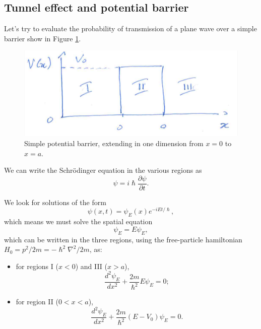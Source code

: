 \subsection{Tunnel effect and potential barrier}
Let's try to evaluate the probability of transmission of a plane wave over a simple barrier show in Figure \ref{nuclear-physics-fig:6}.
\begin{figure}[h]
    \centering
    \includegraphics[scale=0.35]{Figures/nuclear-physics-fig6}
    \caption{Simple potential barrier, extending in one dimension from \(x=0\) to \(x=a\).}
    \label{nuclear-physics-fig:6}
\end{figure}
We can write the Schr\"odinger equation in the various regions as
\begin{equation*}
    [H_0 + V(x)]\psi = i\hslash\frac{\partial \psi}{\partial t}.
\end{equation*}

We look for solutions of the form
\begin{equation*}
    \psi (x,t) = \psi_{E}(x)e^{-iEt/\hslash}, %
\end{equation*}
which means we must solve the spatial equation
\begin{equation*}
    [H_0 + V(x)]\psi_E = E\psi_E,
\end{equation*}
which can be written in the three regions, using the free-particle hamiltonian $H_0=p^2/2m=-\hslash^2\nabla^2/2m$, as:
\begin{itemize}
    \item for regions I ($x<0$) and III ($x>a$), \begin{equation}
        \frac{d^2\psi_E}{dx^2} + \frac{2m}{\hslash^2}E\psi_E = 0;
    \end{equation}
    \item for region II ($0<x<a$),
    \begin{equation*}
        \frac{d^2\psi_E}{dx^2}+\frac{2m}{\hslash^2}(E-V_0)\psi_E = 0.
    \end{equation*}
\end{itemize}

